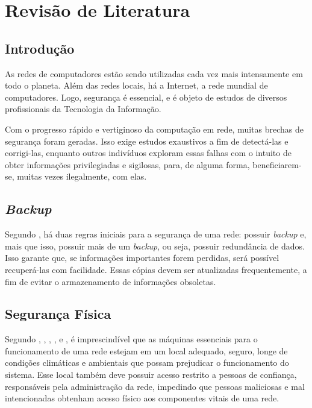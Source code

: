 \documentclass{abnt}
\begin{document}
\folhaderosto

\sumario

\chapter{Revisão de Literatura}

\section{Introdução}

As redes de computadores estão sendo utilizadas cada vez mais intensamente em todo o planeta. Além das redes locais, há a Internet,
a rede mundial de computadores. Logo, segurança é essencial, e é objeto de estudos de diversos profissionais da Tecnologia da Informação.

Com o progresso rápido e vertiginoso da computação em rede, muitas brechas de segurança foram geradas. Isso exige estudos exaustivos a fim
de detectá-las e corrigi-las, enquanto outros indivíduos exploram essas falhas com o intuito de obter informações privilegiadas
e sigilosas, para, de alguma forma, beneficiarem-se, muitas vezes ilegalmente, com elas.


\section{\textit{Backup}}

Segundo , há duas regras iniciais para a segurança de uma rede: possuir \textit{backup} e, mais que isso, possuir mais de
um \textit{backup}, ou seja, possuir redundância de dados. Isso garante que, se informações importantes forem perdidas, será possível
recuperá-las com facilidade. Essas cópias devem ser atualizadas frequentemente, a fim de evitar o armazenamento de informações obsoletas.


\section{Segurança Física}

Segundo , , , ,  e , é imprescindível que as
máquinas essenciais para o funcionamento de uma rede estejam em um local adequado, seguro, longe de condições climáticas e ambientais que
possam prejudicar o funcionamento do sistema. Esse local também deve possuir acesso restrito a pessoas de confiança, responsáveis pela
administração da rede, impedindo que pessoas maliciosas e mal intencionadas obtenham acesso físico aos componentes vitais de uma rede.
\end{document}
